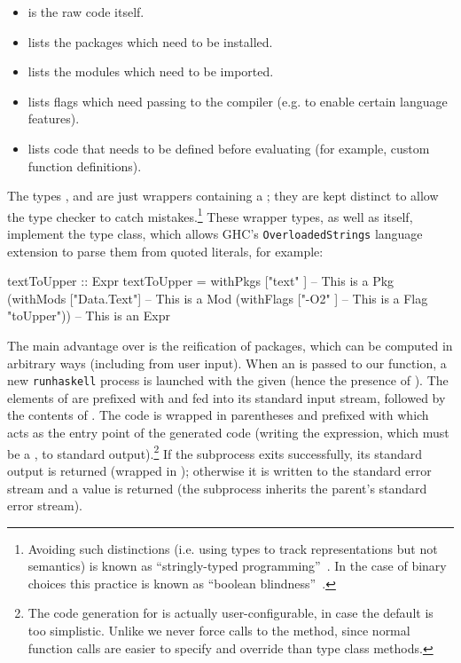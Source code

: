 \begin{itemize}
\item {} is the raw code itself.
\item {} lists the packages which need to be installed.
\item {} lists the modules which need to be imported.
\item {} lists flags which need passing to the compiler (e.g.
  to enable certain language features).
\item {} lists code that needs to be defined before
  evaluating (for example, custom function definitions).
\end{itemize}

The types ,  and  are just wrappers containing a
; they are kept distinct to allow the type checker to catch
mistakes.\footnote{Avoiding such distinctions (i.e. using types to track
  representations but not semantics) is known as ``stringly-typed
  programming''~\cite{c2stringlytyped}. In the case of binary choices this
  practice is known as ``boolean blindness''~\cite[\S~26.2]{Harper:2009}.} These
wrapper types, as well as  itself, implement the  type
class, which allows GHC's \texttt{OverloadedStrings} language extension to parse
them from quoted literals, for example:

\begin{haskell}
textToUpper :: Expr
textToUpper = withPkgs       ["text"     ]  -- This is a  Pkg
                (withMods    ["Data.Text"]  -- This is a  Mod
                  (withFlags ["-O2"      ]  -- This is a  Flag
                    "toUpper"))             -- This is an Expr
\end{haskell}

The main advantage over \hint{} is the reification of packages, which can be
computed in arbitrary ways (including from user input). When an  is
passed to our  function, a new \texttt{runhaskell} process is launched
with the given  (hence the presence of ). The elements of
 are prefixed with  and fed into its standard input
stream, followed by the contents of . The  code is
wrapped in parentheses and prefixed with  which acts
as the entry point of the generated code (writing the expression, which must be
a , to standard output).\footnote{The code generation for 
  is actually user-configurable, in case the default is too simplistic. Unlike
  \hint{} we never force calls to the  method, since normal function
  calls are easier to specify and override than type class methods.} If the
subprocess exits successfully, its standard output is returned (wrapped in
); otherwise it is written to the standard error stream and a
 value is returned (the subprocess inherits the parent's standard
error stream).

